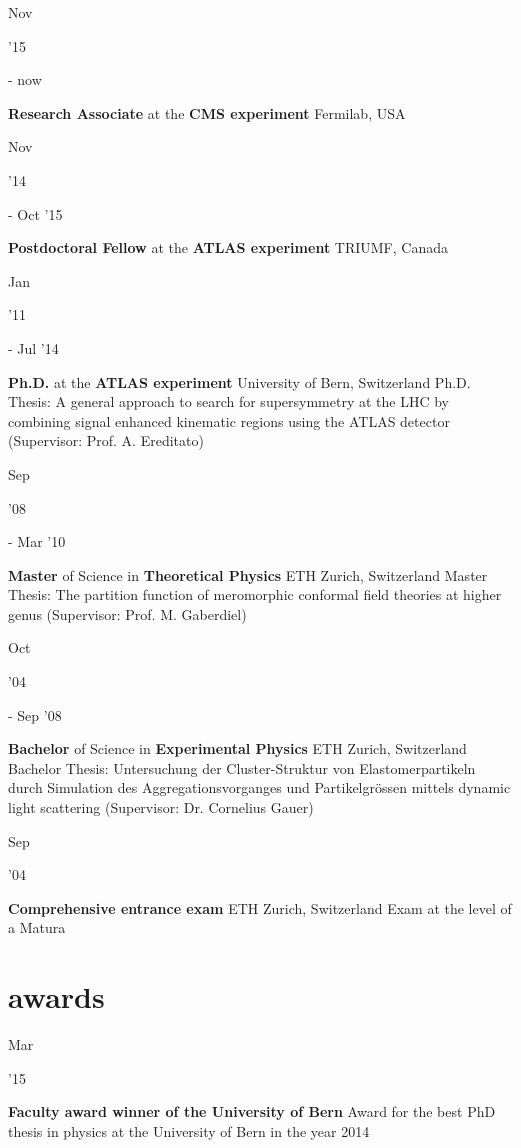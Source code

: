 \documentclass[]{cv} %
\begin{document}
\begin{entrylist}
  \entry
  {\parbox[t]{\parboxWidthOne}{Nov}\parbox[t]{\parboxWidthTwo}{\hfill '15} - now}
  {\textbf{Research Associate} at the \textbf{CMS experiment}}
  {Fermilab, USA}
  {}
  \entry
  {\parbox[t]{\parboxWidthOne}{Nov}\parbox[t]{\parboxWidthTwo}{\hfill '14} - Oct '15}
  {\textbf{Postdoctoral Fellow} at the \textbf{ATLAS experiment}}
  {TRIUMF, Canada}
  {}
  \entry
  {\parbox[t]{\parboxWidthOne}{Jan}\parbox[t]{\parboxWidthTwo}{\hfill '11} - Jul '14}
  {\textbf{Ph.D.} at the \textbf{ATLAS experiment}}
  {University of Bern, Switzerland}
  {Ph.D. Thesis: A general approach to search for supersymmetry at the LHC by combining signal enhanced kinematic regions using the ATLAS detector (Supervisor:
  Prof. A. Ereditato)}
  \entry
  {\parbox[t]{\parboxWidthOne}{Sep}\parbox[t]{\parboxWidthTwo}{\hfill '08} - Mar '10}
  {\textbf{Master} of Science in \textbf{Theoretical Physics}}
  {ETH Zurich, Switzerland}
  {Master Thesis: The partition function of meromorphic conformal field theories at higher genus (Supervisor: Prof. M. Gaberdiel)}
  \entry
  {\parbox[t]{\parboxWidthOne}{Oct}\parbox[t]{\parboxWidthTwo}{\hfill '04} - Sep '08}
  {\textbf{Bachelor} of Science in \textbf{Experimental Physics}}
  {ETH Zurich, Switzerland}
  {Bachelor Thesis: Untersuchung der Cluster-Struktur von Elastomerpartikeln durch Simulation des Aggregationsvorganges und Partikelgr{\"o}ssen mittels dynamic
light scattering (Supervisor: Dr. Cornelius Gauer)}
\entry
{\parbox[t]{\parboxWidthOne}{Sep}\parbox[t]{\parboxWidthTwo}{\hfill '04}}
{\textbf{Comprehensive entrance exam}}
{ETH Zurich, Switzerland}
{Exam at the level of a Matura}
\end{entrylist}

\section{awards}

\begin{entrylist}

  \entry
  {\parbox[t]{\parboxWidthOne}{Mar} '15}
  {\textbf{Faculty award winner of the University of Bern}}
  {}
  {Award for the best PhD thesis in physics at the University of Bern in the
  year 2014}

\end{entrylist}
\end{document}
